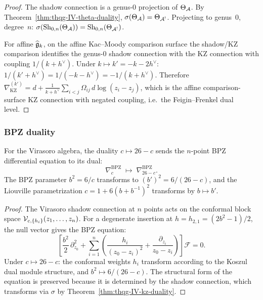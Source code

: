 \begin{proof}
The shadow connection is a genus-$0$ projection of $\Theta_{\mathcal{A}}$.
By Theorem~\ref{thm:thqg-IV-theta-duality}, $\sigma(\Theta_{\mathcal{A}}) = \Theta_{\mathcal{A}^!}$.
Projecting to genus~$0$, degree~$n$:
$\sigma(\mathrm{Sh}_{0,n}(\Theta_{\mathcal{A}})) = \mathrm{Sh}_{0,n}(\Theta_{\mathcal{A}^!})$.

For affine $\widehat{\mathfrak{g}}_k$, on the affine Kac--Moody comparison
surface the shadow/KZ comparison identifies the genus-$0$ shadow
connection with the KZ connection with coupling $1/(k + h^\vee)$. Under
$k \mapsto k' = -k - 2h^\vee$:
$1/(k' + h^\vee) = 1/(-k - h^\vee) = -1/(k + h^\vee)$.
Therefore
$\nabla_{\mathrm{KZ}}^{(k')} = d + \frac{1}{k+h^\vee}
\sum_{i<j}\Omega_{ij}\,d\log(z_i - z_j)$,
which is the affine comparison-surface KZ connection with negated
coupling, i.e.\ the Feigin--Frenkel dual level.
\end{proof}

\subsubsection{BPZ duality}

\begin{proposition}
\label{prop:thqg-IV-bpz-duality}
For the Virasoro algebra, the duality $c \mapsto 26 - c$ sends
the $n$-point BPZ differential equation to its dual:
\begin{equation}%
\nabla^{\mathrm{BPZ}}_c \;\longmapsto\; \nabla^{\mathrm{BPZ}}_{26-c}.
\end{equation}
The BPZ parameter $b^2 = 6/c$ transforms to
$(b')^2 = 6/(26-c)$, and the Liouville parametrization
$c = 1 + 6(b + b^{-1})^2$ transforms by $b \mapsto b'$.
\end{proposition}

\begin{proof}
The Virasoro shadow connection at $n$ points acts on the conformal
block space $\mathcal{V}_{c, \{h_i\}}(z_1, \ldots, z_n)$.
For a degenerate insertion at $h = h_{2,1} = (2b^2 - 1)/2$,
the null vector gives the BPZ equation:
\[
\left[
 \frac{b^2}{2}\,\partial_{z_0}^2
 + \sum_{i=1}^n \left(
 \frac{h_i}{(z_0 - z_i)^2}
 + \frac{\partial_{z_i}}{z_0 - z_i}
 \right)
\right]
\mathcal{F} = 0.
\]
Under $c \mapsto 26 - c$: the conformal weights $h_i$ transform
according to the Koszul dual module structure, and $b^2 \mapsto 6/(26-c)$.
The structural form of the equation is preserved because it is
determined by the shadow connection, which transforms via
$\sigma$ by Theorem~\ref{thm:thqg-IV-kz-duality}.
\end{proof}

